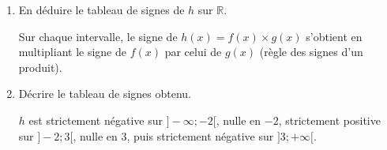\documentclass[10pt,a4paper]{article}
\begin{document}
\begin{sujets}
\begin{enumerate}
\begin{center}
\begin{minipage}{0.48\linewidth}
\(f\) a pour coefficient directeur \(a=-1<0\) : \(f\) est décroissante.
\[
\begin{aligned}
f(x)&>0\\
-x+3&>0 &\scriptstyle(-3)\\
-x&>-3 &\scriptstyle(\div(-1))\\
x&<3.
\end{aligned}
\]
\end{minipage}
\hfill
\begin{minipage}{0.48\linewidth}
\(g\) a pour coefficient directeur \(a=3>0\) : \(g\) est croissante.
\[
\begin{aligned}
g(x)&>0\\
3x+6&>0 &\scriptstyle(-6)\\
3x&>-6 &\scriptstyle(\div 3)\\
x&>-2.
\end{aligned}
\]
\end{minipage}
\end{center}

\item En déduire le tableau de signes de \(h\) sur \(\mathbb{R}\).

Sur chaque intervalle, le signe de \(h(x)=f(x)\times g(x)\) s'obtient en multipliant le signe de \(f(x)\) par celui de \(g(x)\) (règle des signes d'un produit).

\begin{center}
\end{center}

\item Décrire le tableau de signes obtenu.

\(h\) est strictement négative sur \(]-\infty;-2[\), nulle en \(-2\), strictement positive sur \(]-2;3[\), nulle en \(3\), puis strictement négative sur \(]3;+\infty[\).
\end{enumerate}

\end{sujets}
\end{document}
